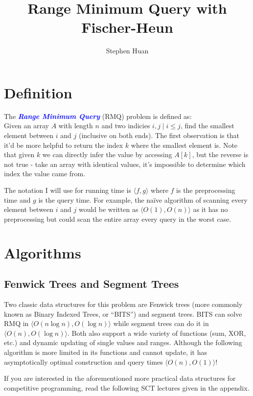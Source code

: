 \documentclass[11pt, oneside]{article}
\title{Range Minimum Query with Fischer-Heun}
\author{Stephen Huan}
\newcommand{\emphasis}[1]{\textcolor{blue}{\textbf{\textit{#1}}}}
\begin{document}
\maketitle

\section{Definition}

The \emphasis{Range Minimum Query} (RMQ) problem is defined as: \\
Given an array \( A \) with length \( n \) and two indicies \( i, j \mid i \leq j \),
find the smallest element between \( i \) and \( j \) (inclusive on both ends).
The first observation is that it'd be more helpful to return the index \( k \)
where the smallest element is. Note that given \( k \) we can directly infer the value
by accessing \( A[k] \), but the reverse is not true - take an array with identical values,
it's impossible to determine which index the value came from.

The notation I will use for running time is \( \langle f, g \rangle \)
where \( f \) is the preprocessing time and \( g \) is the query time. For example,
the naïve algorithm of scanning every element between \( i \) and \( j \)
would be written as \( \langle O(1), O(n) \rangle \) as it has no preprocessing
but could scan the entire array every query in the worst case.

\section{Algorithms}
\subsection{Fenwick Trees and Segment Trees}

Two classic data structures for this problem are Fenwick trees (more commonly known as Binary Indexed Trees, or ``BITS'')
and segment trees. BITS can solve RMQ in \( \langle O(n \log n), O(\log n) \rangle \) while segment trees
can do it in \( \langle O(n), O(\log n) \rangle \). Both also support a wide variety of functions (sum, XOR, etc.) and
dynamic updating of single values and ranges. Although the following algorithm is more limited in its functions
and cannot update, it has asymptotically optimal construction and query times \( \langle O(n), O(1) \rangle \)!

If you are interested in the aforementioned more practical data structures for competitive programming,
read the following SCT lectures given in the appendix.
\end{document}
